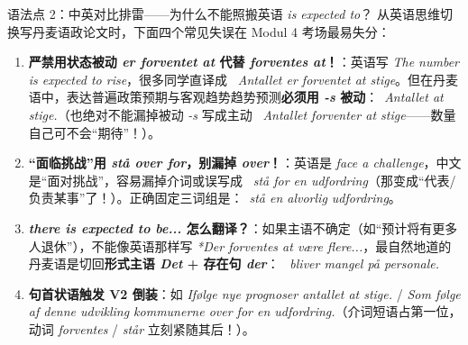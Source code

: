 \begin{grammatikbox}{语法点 2：中英对比排雷——为什么不能照搬英语 \textit{is expected to}？}
从英语思维切换写丹麦语政论文时，下面四个常见失误在 Modul 4 考场最易失分：
\begin{enumerate}
  \item \textbf{严禁用状态被动 \textit{er forventet at} 代替 \textit{forventes at}！}：英语写 \textit{The number is expected to rise}，很多同学直译成 \ \textit{Antallet er forventet at stige}。但在丹麦语中，表达普遍政策预期与客观趋势趋势预测\textbf{必须用 \textit{-s} 被动}：\ \textit{Antallet  at stige.}（也绝对不能漏掉被动 \textit{-s} 写成主动 \ \textit{Antallet forventer at stige}——数量自己可不会“期待”！）。
  \item \textbf{“面临挑战”用 \textit{stå over for}，别漏掉 \textit{over}！}：英语是 \textit{face a challenge}，中文是“面对挑战”，容易漏掉介词或误写成 \ \textit{stå for en udfordring}（那变成“代表/负责某事”了！）。正确固定三词组是：\ \textit{stå  en alvorlig udfordring}。
  \item \textbf{\textit{there is expected to be...} 怎么翻译？}：如果主语不确定（如“预计将有更多人退休”），不能像英语那样写 \textit{*Der forventes at være flere...}，最自然地道的丹麦语是切回\textbf{形式主语 \textit{Det} + 存在句 \textit{der}}：\ \textit{ bliver mangel på personale.}
  \item \textbf{句首状语触发 V2 倒装}：如 \textit{Ifølge nye prognoser  antallet at stige.} / \textit{Som følge af denne udvikling  kommunerne over for en udfordring.}（介词短语占第一位，动词 \textit{forventes} / \textit{står} 立刻紧随其后！）。
\end{enumerate}
\end{grammatikbox}


